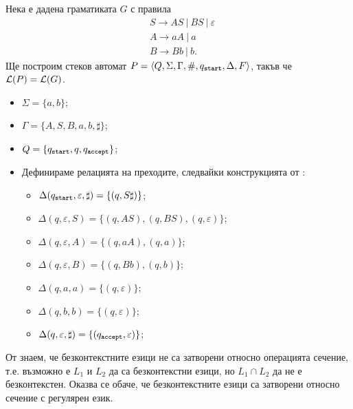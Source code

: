 \begin{extra}
\begin{example}
  Нека е дадена граматиката $G$ с правила 
  \begin{align*}
    & S \to AS\ |\ BS\ |\ \varepsilon\\
    & A \to aA\ |\ a\\
    & B \to Bb\ |\ b.
  \end{align*}
  Ще построим стеков автомат $P = \langle{Q,\Sigma,\Gamma,\#,q_{\texttt{start}},\Delta,F}\rangle$, такъв че $\mathcal{L}(P) = \mathcal{L}(G)$.
  \begin{itemize}
  \item
    $\Sigma = \{a,b\}$;
  \item 
    $\Gamma = \{A,S,B,a,b,\sharp\}$;
  \item
    $Q = \{q_{\texttt{start}},q,q_{\texttt{accept}}\}$;
  \item
    Дефинираме релацията на преходите, следвайки конструкцията от :
    \begin{itemize}
    \item
      $\Delta(q_{\texttt{start}}, \varepsilon, \sharp) = \{(q, S\sharp)\}$;
    \item 
      $\Delta(q, \varepsilon, S) = \{(q, AS), (q, BS), (q, \varepsilon)\}$;
    \item
      $\Delta(q, \varepsilon, A) = \{(q, aA), (q, a)\}$;
    \item
      $\Delta(q, \varepsilon, B) = \{(q, Bb), (q, b)\}$;
    \item
      $\Delta(q, a, a) = \{(q, \varepsilon)\}$;
    \item
      $\Delta(q, b, b) = \{(q, \varepsilon)\}$;
    \item
      $\Delta(q, \varepsilon, \sharp) = \{(q_{\texttt{accept}},\varepsilon)\}$;
    \end{itemize}
  \end{itemize}
\end{example}
\end{extra}


От  знаем, че безконтекстните езици не
са затворени относно операцията сечение, т.е. възможно е $L_1$ и $L_2$ да са безконтекстни
езици, но $L_1 \cap L_2$ да не е безконтекстен.
Оказва се обаче, че безконтекстните езици са затворени относно сечение с регулярен език.


